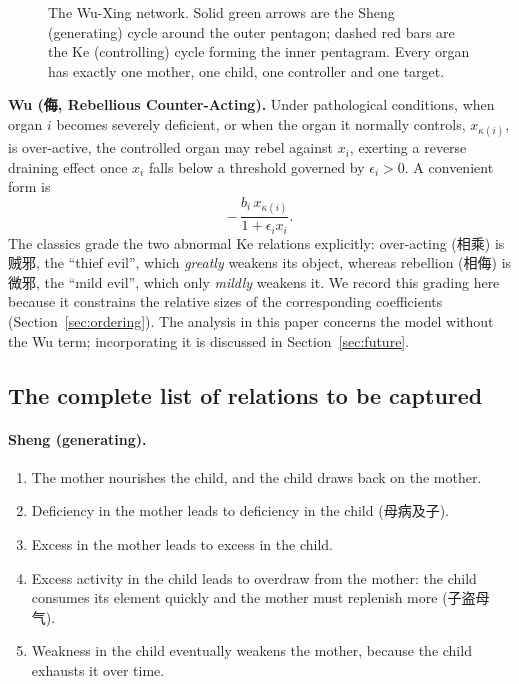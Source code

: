 \documentclass[11pt]{article}
\begin{document}
\begin{figure}[!htb]
\centering
{}
\caption{The Wu-Xing network. Solid green arrows are the Sheng (generating)
cycle around the outer pentagon; dashed red bars are the Ke (controlling) cycle
forming the inner pentagram. Every organ has exactly one mother, one child, one
controller and one target.}
\label{fig:network}
\end{figure}

\medskip
\noindent\textbf{Wu (侮, Rebellious Counter-Acting).}
Under pathological conditions, when organ $i$ becomes severely deficient, or when
the organ it normally controls, $x_{\kappa(i)}$, is over-active, the controlled
organ may rebel against $x_i$, exerting a reverse draining effect once $x_i$
falls below a threshold governed by $\epsilon_i>0$. A convenient form is
\[
-\,\frac{b_i\,x_{\kappa(i)}}{1+\epsilon_i x_i}.
\]
The classics grade the two abnormal Ke relations explicitly: over-acting (相乘)
is 贼邪, the ``thief evil'', which \emph{greatly} weakens its object, whereas
rebellion (相侮) is 微邪, the ``mild evil'', which only \emph{mildly} weakens it.
We record this grading here because it constrains the relative sizes of the
corresponding coefficients (Section~\ref{sec:ordering}). The analysis in this
paper concerns the model without the Wu term; incorporating it is discussed in
Section~\ref{sec:future}.

\subsection{The complete list of relations to be captured}

\paragraph{Sheng (generating).}
\begin{enumerate}
\item The mother nourishes the child, and the child draws back on the mother.
\item Deficiency in the mother leads to deficiency in the child (母病及子).
\item Excess in the mother leads to excess in the child.
\item Excess activity in the child leads to overdraw from the mother: the child
      consumes its element quickly and the mother must replenish more
      (子盗母气).
\item Weakness in the child eventually weakens the mother, because the child
      exhausts it over time.
\end{enumerate}
\end{document}
